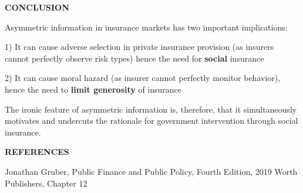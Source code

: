 \documentclass[landscape]{slides}
\begin{document}
\begin{slide}
\begin{center}
{\bf CONCLUSION}
\end{center}

Asymmetric information in insurance markets has two important implications:

1) It can cause adverse selection in private insurance provision (as insurers cannot perfectly observe risk types) hence the need for \textbf{social} insurance

2) It can cause moral hazard (as insurer cannot perfectly monitor behavior), hence the need
to \textbf{limit generosity} of insurance

The ironic feature of asymmetric information is, therefore, that it simultaneously motivates and undercuts the rationale for government intervention through social insurance.

\end{slide}

\begin{slide}
\begin{center}
{\bf REFERENCES}
\end{center}
{\small

Jonathan Gruber, Public Finance and Public Policy, Fourth Edition, 2019 Worth Publishers, Chapter 12

}

\end{slide}
\end{document}
